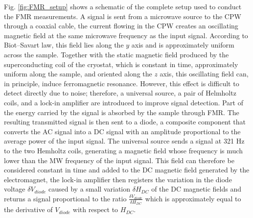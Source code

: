 \documentclass[12pt,a4paper,oneside,openany]{book}
\begin{document}
Fig. \ref{fig:FMR_setup} shows a schematic of the complete setup used to conduct the FMR measurements. A signal is sent from a microwave source to the CPW through a coaxial cable, the current flowing in the CPW creates an oscillating magnetic field at the same microwave frequency as the input signal. According to Biot–Savart law, this field lies along the $y$ axis and is approximately uniform across the sample. Together with the static magnetic field produced by the superconducting coil of the cryostat, which is constant in time, approximately uniform along the sample, and oriented along the $z$ axis, this oscillating field can, in principle, induce ferromagnetic resonance. However, this effect is difficult to detect directly due to noise; therefore, a universal source, a pair of Helmholtz coils, and a lock-in amplifier are introduced to improve signal detection. Part of the energy carried by the signal is absorbed by the sample through FMR. The resulting transmitted signal is then sent to a diode, a composite component that converts the AC signal into a DC signal with an amplitude proportional to the average power of the input signal. The universal source sends a signal at 321 Hz to the two Hemholtz coils, generating a magnetic field whose frequency is much lower than the MW frequency of the input signal. This field can therefore be considered constant in time and added to the DC magnetic field generated by the electromagnet, the lock-in amplifier then registers the variation in the diode voltage $\delta V_{diode}$ caused by a small variation $\delta H_{DC}$ of the DC magnetic fields and returns a signal proportional to the ratio $\frac{\delta V_{diode}}{\delta H_{DC}}$ which is approximately equal to the derivative of $V_{diode}$ with respect to $H_{DC}$. 
\end{document}
